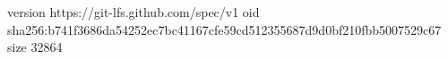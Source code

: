 version https://git-lfs.github.com/spec/v1
oid sha256:b741f3686da54252ec7bc41167cfe59cd512355687d9d0bf210fbb5007529c67
size 32864
